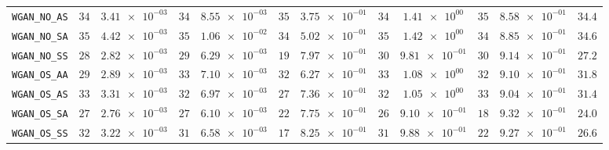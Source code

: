 \begin{xltabular}{\textwidth}{l||cC|cC|cC|cC|cC||c}
	\texttt{WGAN\_NO\_AS} & $ 34$ & $ \num{3.41e-03}$ & $ 34$ & $ \num{8.55e-03}$ & $ 35$ & $ \num{3.75e-01}$ & $ 34$ & $ \num{1.41e+00}$ & $ 35$ & $ \num{8.58e-01}$ & $ 34.4$  \\
	\texttt{WGAN\_NO\_SA} & $ 35$ & $ \num{4.42e-03}$ & $ 35$ & $ \num{1.06e-02}$ & $ 34$ & $ \num{5.02e-01}$ & $ 35$ & $ \num{1.42e+00}$ & $ 34$ & $ \num{8.85e-01}$ & $ 34.6$  \\
	\texttt{WGAN\_NO\_SS} & $ 28$ & $ \num{2.82e-03}$ & $ 29$ & $ \num{6.29e-03}$ & $ 19$ & $ \num{7.97e-01}$ & $ 30$ & $ \num{9.81e-01}$ & $ 30$ & $ \num{9.14e-01}$ & $ 27.2$  \\
	\texttt{WGAN\_OS\_AA} & $ 29$ & $ \num{2.89e-03}$ & $ 33$ & $ \num{7.10e-03}$ & $ 32$ & $ \num{6.27e-01}$ & $ 33$ & $ \num{1.08e+00}$ & $ 32$ & $ \num{9.10e-01}$ & $ 31.8$  \\
	\texttt{WGAN\_OS\_AS} & $ 33$ & $ \num{3.31e-03}$ & $ 32$ & $ \num{6.97e-03}$ & $ 27$ & $ \num{7.36e-01}$ & $ 32$ & $ \num{1.05e+00}$ & $ 33$ & $ \num{9.04e-01}$ & $ 31.4$  \\
	\texttt{WGAN\_OS\_SA} & $ 27$ & $ \num{2.76e-03}$ & $ 27$ & $ \num{6.10e-03}$ & $ 22$ & $ \num{7.75e-01}$ & $ 26$ & $ \num{9.10e-01}$ & $ 18$ & $ \num{9.32e-01}$ & $ 24.0$  \\
	\texttt{WGAN\_OS\_SS} & $ 32$ & $ \num{3.22e-03}$ & $ 31$ & $ \num{6.58e-03}$ & $ 17$ & $ \num{8.25e-01}$ & $ 31$ & $ \num{9.88e-01}$ & $ 22$ & $ \num{9.27e-01}$ & $ 26.6$  \\

\end{xltabular}
